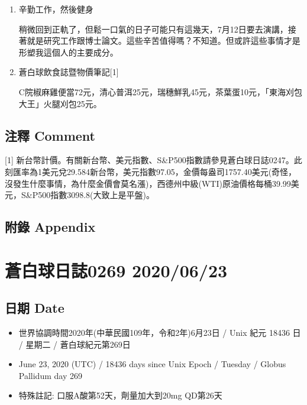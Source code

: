 \documentclass[
]{article}
\providecommand{\tightlist}{%
  \setlength{\itemsep}{0pt}\setlength{\parskip}{0pt}}
\begin{document}
\begin{enumerate}
\def\labelenumi{\arabic{enumi}.}
\item
  辛勤工作，然後健身

  稍微回到正軌了，但鬆一口氣的日子可能只有這幾天，7月12日要去演講，接著就是研究工作跟博士論文。這些辛苦值得嗎？不知道。但或許這些事情才是形塑我這個人的主要成分。
\item
  蒼白球飲食誌暨物價筆記{[}1{]}

  C院椒麻雞便當72元，清心普洱25元，瑞穗鮮乳45元，茶葉蛋10元，「東海刈包大王」火腿刈包25元。
\end{enumerate}

\hypertarget{ux6ce8ux91cb-comment-19}{%
\subsection{注釋 Comment}\label{ux6ce8ux91cb-comment-19}}

{[}1{]}
新台幣計價。有關新台幣、美元指數、S\&P500指數請參見蒼白球日誌0247。此刻匯率為1美元兌29.584新台幣，美元指數97.05，金價每盎司1757.40美元(奇怪，沒發生什麼事情，為什麼金價會莫名漲)，西德州中級(WTI)原油價格每桶39.99美元，S\&P500指數3098.8(大致上是平盤)。

\hypertarget{ux9644ux9304-appendix-19}{%
\subsection{附錄 Appendix}\label{ux9644ux9304-appendix-19}}

\hypertarget{ux84bcux767dux7403ux65e5ux8a8c0269-20200623}{%
\section{蒼白球日誌0269
2020/06/23}\label{ux84bcux767dux7403ux65e5ux8a8c0269-20200623}}

\hypertarget{ux65e5ux671f-date-20}{%
\subsection{日期 Date}\label{ux65e5ux671f-date-20}}

\begin{itemize}
\tightlist
\item
  世界協調時間2020年(中華民國109年，令和2年)6月23日 / Unix 紀元 18436 日
  / 星期二 / 蒼白球紀元第269日
\item
  June 23, 2020 (UTC) / 18436 days since Unix Epoch / Tuesday / Globus
  Pallidum day 269
\item
  特殊註記: 口服A酸第52天，劑量加大到20mg QD第26天
\end{itemize}
\end{document}
